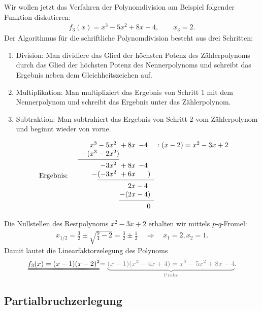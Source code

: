 Wir wollen jetzt das Verfahren der Polynomdivision am Beispiel folgender Funktion diskutieren: 
\begin{align}
    f_3(x) = x^3 - 5x^2 + 8x -4, \qquad x_3 = 2.
\end{align}
Der Algorithmus für die schriftliche Polynomdivision besteht aus drei Schritten:
\begin{enumerate}
    \item Division: Man dividiere das Glied der höchsten Potenz des Zählerpolynoms durch das Glied der höchsten Potenz des Nennerpolynoms und schreibt das Ergebnis neben dem Gleichheitszeichen auf. 
    \item Multiplikation: Man multipliziert das Ergebnis von Schritt 1 mit dem Nennerpolynom und schreibt das Ergebnis unter das Zählerpolynom. 
    \item Subtraktion: Man subtrahiert das Ergebnis von Schritt 2 vom Zählerpolynom und beginnt wieder von vorne.
\end{enumerate}
\begin{align}
    \qq{Ergebnis: }\begin{array}{r@{} r@{} r@{} r r}
        x^3 &{}-5x^2\hphantom{)}&{}+8x&-4\hphantom{)} &:(x-2) = x^2 -3x +2 \\
      -(x^3 &{}-2x^2) &\\
      \cmidrule{1-2}
            & -3x^2\hphantom{)} &{}+8x&-4\hphantom{)}\\
            -&(-3x^2\hphantom{)} &{}+6x&\hphantom{-4}) \\
      \cmidrule{2-4}
            & &{}2x&{}-4\hphantom{)}\\
            & &-(2x&{}-4)\\
      \cmidrule{3-4} 
            & & & 0
    \end{array}
\end{align}

Die Nullstellen des Restpolynoms $x^2 -3x +2$ erhalten wir mittels $p$-$q$-Fromel: 
\begin{align}
    x_{1/2} = \frac{3}{2} \pm \sqrt{\frac{9}{4}-2} = \frac{3}{2} \pm \frac{1}{2} \quad \Rightarrow \quad x_1 = 2, x_2 =1.
\end{align}
Damit lautet die Linearfaktorzelegung des Polynoms  
\begin{align}
    \uuline{f_3(x) = (x-1) (x-2)^2} \textcolor{gray}{=\underbrace{ (x-1)(x^2-4x+4) = x^3-5x^2 + 8x-4}_{\text{Probe}}}.
\end{align}

\subsection{Partialbruchzerlegung}

